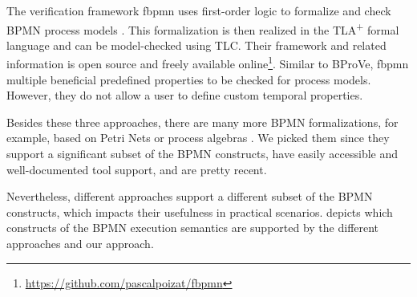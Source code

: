 \documentclass[adraft, copyright, creativecommons]{eptcs} %
\begin{document}
The verification framework \textsf{fbpmn} uses first-order logic to formalize and check BPMN process models \cite{houhouFirstOrderLogicSemantics2019, houhouFirstOrderLogicVerification2022}.
This formalization is then realized in the TLA\textsuperscript{+} formal language and can be model-checked using TLC.
Their framework and related information is open source and freely available online\footnote{\url{https://github.com/pascalpoizat/fbpmn}}.
Similar to BProVe, \textsf{fbpmn} multiple beneficial predefined properties to be checked for process models.
However, they do not allow a user to define custom temporal properties.

Besides these three approaches, there are many more BPMN formalizations, for example, based on Petri Nets \cite{dijkmanSemanticsAnalysisBusiness2008} or process algebras \cite{wongProcessSemanticsBPMN2008}.
We picked them since they support a significant subset of the BPMN constructs, have easily accessible and well-documented tool support, and are pretty recent.

Nevertheless, different approaches support a different subset of the BPMN constructs, which impacts their usefulness in practical scenarios.
 depicts which constructs of the BPMN execution semantics are supported by the different approaches and our approach.
\end{document}

